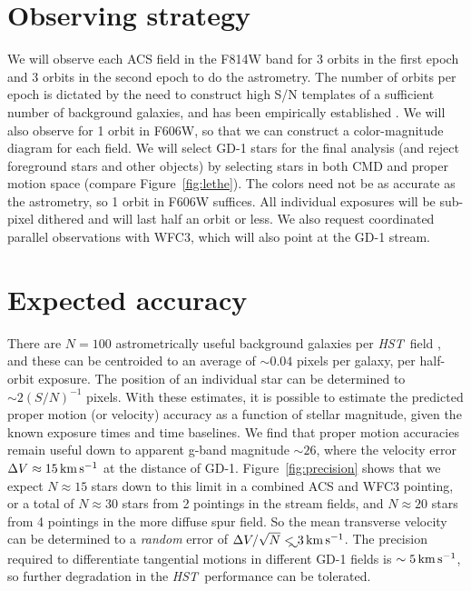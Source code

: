 \documentclass[12pt]{article}
\newcommand{\hst}{\textsl{HST}}
\begin{document}
\section*{Observing strategy}
We will observe each ACS field in the F814W band for 3 orbits in the first epoch and 3 orbits in the second epoch to do the astrometry.
The number of orbits per epoch is dictated by the need to construct high S/N templates of a sufficient number of background galaxies, and has been empirically established \parencite[e.g.,][]{sohn2012}. 
We will also observe for 1 orbit in F606W, so that we can construct a color-magnitude diagram for each field.
We will select GD-1 stars for the final analysis (and reject foreground stars and other objects) by selecting stars in both CMD and proper motion space (compare Figure~\ref{fig:lethe}).
The colors need not be as accurate as the astrometry, so 1 orbit in F606W suffices.
All individual exposures will be sub-pixel dithered and will last half an orbit or less.
We also request coordinated parallel observations with WFC3, which will also point at the GD-1 stream.

\section*{Expected accuracy}
There are $N=100$ astrometrically useful background galaxies per \hst\ field \parencite[e.g.,][]{sohn2012,sohn2013}, and these can be centroided to an average of $\sim0.04$ pixels per galaxy, per half-orbit exposure.
The position of an individual star can be determined to $\sim2(S/N)^{-1}$ pixels.
With these estimates, it is possible to estimate the predicted proper motion (or velocity) accuracy as a function of stellar magnitude, given the known exposure times and time baselines.
We find that proper motion accuracies remain useful down to apparent g-band magnitude $\sim26$, where the velocity error $\Delta V\approx15\,\rm km\,s^{-1}$ at the distance of GD-1.
Figure~\ref{fig:precision} shows that we expect $N\approx15$ stars down to this limit in a combined ACS and WFC3 pointing, or a total of $N\approx30$ stars from 2 pointings in the stream fields, and $N\approx20$ stars from 4 pointings in the more diffuse spur field. 
So the mean transverse velocity can be determined to a \emph{random} error of $\Delta V/\sqrt{N}\lesssim3\,\rm km\,s^{-1}$.
The precision required to differentiate tangential motions in different GD-1 fields is $\sim5\,\rm km\,s^{-1}$, so further degradation in the \hst\ performance can be tolerated.
 
\end{document}
